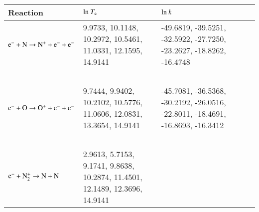 \documentclass{warpdoc}
\renewcommand{\fontsizetable}{\footnotesize\scalefont{0.9}}
\begin{document}
%
\begin{table}[!ht]
  \center\fontsizetable
  \begin{threeparttable}
    \label{tab:11s_spline_tab}
    \fontsizetable
 
    \begin{tabular*}{\textwidth}{@{}l@{\extracolsep{\fill}}llll@{}}
    
    \toprule
    Reaction ~ & ${\rm ln}~T_{\rm e}$ & ${\rm ln}~k$ \\
        \midrule
        
     { $\rm e^- + N \rightarrow N^+ + e^- +e^- $   } &   \begin{minipage}[t]{0.30\textwidth}\raggedright  
          9.9733,   10.1148,   10.2972,   10.5461,   11.0331,   12.1595,   14.9141

 \end{minipage}  & \begin{minipage}[t]{0.35\textwidth}\raggedright 
    -49.6819,  -39.5251,  -32.5922,  -27.7250,  -23.2627,  -18.8262,  -16.4748

\end{minipage} \\       
~\\

 { $\rm e^- +O \rightarrow O^+ + e^- +e^- $   } &   \begin{minipage}[t]{0.3\textwidth}\raggedright  
    9.7444,    9.9402,   10.2102,   10.5776,   11.0606,   12.0831,   13.3654,   14.9141

 \end{minipage}  & \begin{minipage}[t]{0.35\textwidth}\raggedright 
  -45.7081,  -36.5368,  -30.2192,  -26.0516, -22.8011,  -18.4691, -16.8693,  -16.3412

\end{minipage} \\      
~\\

   { $\rm e^- +  N_2^+ \rightarrow   N+N  $   } &  \begin{minipage}[t]{0.3\textwidth}\raggedright  
         2.9613,    5.7153,    9.1741,    9.8638,   10.2874,   11.4501,   12.1489,   12.3696,   14.9141


\end{minipage}
\end{tabular*}
\end{threeparttable}
\end{table}
\end{document}
